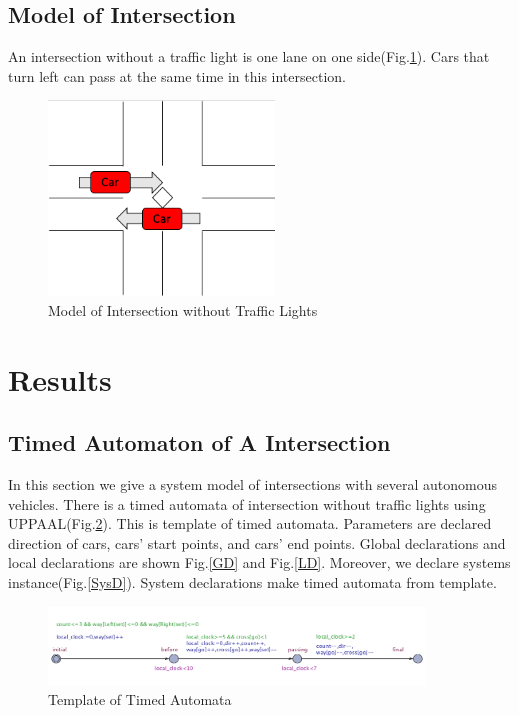 \documentclass[]{article}
\begin{document}
	\subsection{Model of Intersection}
		An intersection without a traffic light is one lane on one side(Fig.\ref{Intersec}).  Cars that turn left can pass at the same time in this intersection.  
		\begin{figure}
		\centering
		\includegraphics[width=60mm]{model_Inter.png}
		\caption{Model of Intersection without Traffic Lights}
		\label{Intersec}
		\end{figure}
\section{Results}
	\subsection{Timed Automaton of A Intersection}
		In this section we give a system model of intersections with several autonomous vehicles.  There is a timed automata of intersection without traffic lights using UPPAAL(Fig.\ref{temp}).  This is template of timed automata.  Parameters are declared direction of cars, cars' start points, and cars' end points.  Global declarations and local declarations are shown Fig.\ref{GD} and Fig.\ref{LD}.  Moreover, we declare systems instance(Fig.\ref{SysD}). System declarations make timed automata from template.
		\begin{figure}
		\centering
		\includegraphics[width=100mm]{temp.png}
		\caption{Template of Timed Automata}
		\label{temp}
		\end{figure}
		
\end{document}
